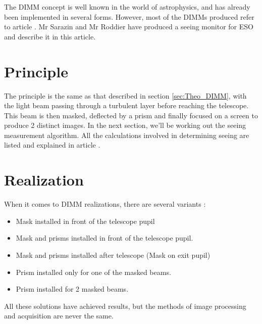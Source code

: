 The \Gls{DIMM} concept is well known in the world of astrophysics, and has already been implemented in several forms.
However, most of the \Gls{DIMM}s produced refer to article \cite{DIMM_ESO}. Mr Sarazin and Mr Roddier have produced 
a seeing monitor for ESO and describe it in this article.

\section{Principle}
The principle is the same as that described in section \ref{sec:Theo_DIMM}, with the light beam passing through a turbulent layer 
before reaching the telescope. This beam is then masked, deflected by a prism and finally focused on a screen to produce 
2 distinct images. In the next section, we'll be working out the seeing measurement algorithm. All the calculations involved 
in determining seeing are listed and explained in article \cite{DIMM_ESO}.
\section{Realization}
When it comes to \Gls{DIMM} realizations, there are several variants :
\begin{itemize}
    \item Mask installed in front of the telescope pupil
    \item Mask and prisms installed in front of the telescope pupil.
    \item Mask and prisms installed after telescope (Mask on exit pupil)
    \item Prism installed only for one of the masked beams.
    \item Prism installed for 2 masked beams.
\end{itemize}
All these solutions have achieved results, but the methods of image processing and acquisition are never the same.
